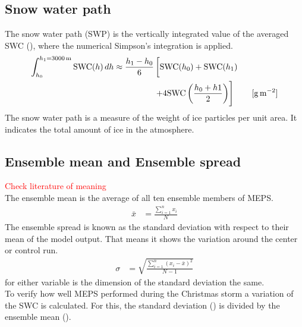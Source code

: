 \subsection{Snow water path}
The snow water path (SWP) is the vertically integrated value of the averaged SWC (), where the numerical Simpson's integration is applied.  
\begin{equation}
\begin{split}
\int_{h_0}^{h_1=\SI{3000}{\metre}} \text{SWC}(h) \, dh \approx 
\frac{h_1 - h_0}{6}  & \left[ \text{SWC}(h_0)    + \text{SWC}(h_1)   \vphantom{\frac{h_0 + h1}{2}} \right. \\ 
& \left. + 4 \text{SWC}\left(\frac{h_0 + h1}{2}\right)  
\right] \qquad [\SI{}{\g\per\square\meter}]
\end{split}
\label{eq:SWP}
\end{equation}
The snow water path is a measure of the weight of ice particles per unit area. It indicates the total amount of ice in the atmosphere.
\subsection{Ensemble mean and Ensemble spread}\label{sec:ens_mean_spread}
\textcolor{red}{Check literature of meaning} \\
The ensemble mean is the average of all ten ensemble members of MEPS.
\begin{align}
	\bar{x} & = \frac{\sum_{i=1}^n x_i}{N} \label{eq:meanMEPS}
\end{align}
The ensemble spread is known as the standard deviation with respect to their mean of the model output. That means it shows the variation around the center or control run.
\begin{align}
	\sigma & = \sqrt{\frac{\sum_{i=1}^n (x_i - \bar{x})^2}{N-1}} \label{eq:stdMEPS}
\end{align}
for either variable is the dimension of the standard deviation the same.
\\
To verify how well MEPS performed during the Christmas storm a variation of the SWC is calculated. For this, the standard deviation () is divided by the ensemble mean ().


